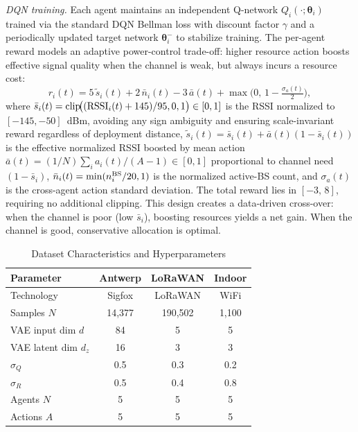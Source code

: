 \documentclass[conference]{IEEEtran}
\begin{document}
\textit{DQN training.}
Each agent maintains an independent Q-network $Q_i(\cdot;\bm{\theta}_i)$
trained via the standard DQN Bellman loss with discount factor $\gamma$
and a periodically updated target network $\bm{\theta}_i^-$
to stabilize training. The per-agent reward models an adaptive
power-control trade-off: higher resource action boosts effective signal
quality when the channel is weak, but always incurs a resource cost:
\vspace{-4pt}
\begin{equation}
r_i(t) = 5\,\tilde{s}_i(t) + 2\,\bar{n}_i(t)
        - 3\,\bar{a}(t)
        + \max\!\bigl(0,\,1 - \tfrac{\sigma_a(t)}{2}\bigr),
\label{eq:reward}
\end{equation}
\vspace{-2pt}
where $\bar{s}_i(t)=\mathrm{clip}\!\bigl(({\rm RSSI}_i(t)+145)/95,0,1\bigr)\in[0,1]$
is the RSSI normalized to $[-145,-50]$~dBm, avoiding any sign ambiguity
and ensuring scale-invariant reward regardless of deployment distance,
$\tilde{s}_i(t)=\bar{s}_i(t)+\bar{a}(t)(1-\bar{s}_i(t))$ is the
effective normalized RSSI boosted by mean action
$\bar{a}(t)=(1/N)\sum_i a_i(t)/(A{-}1)\in[0,1]$
proportional to channel need $(1-\bar{s}_i)$,
$\bar{n}_i(t)=\min(n_i^{\rm BS}/20,1)$ is the normalized active-BS count,
and $\sigma_a(t)$ is the cross-agent action standard deviation.
The total reward lies in $[-3,\,8]$, requiring no additional clipping.
This design creates a data-driven cross-over: when the channel is poor
(low $\bar{s}_i$), boosting resources yields a net gain. When the
channel is good, conservative allocation is optimal.

\begin{table}[t]
\centering
\caption{Dataset Characteristics and Hyperparameters}
\label{tab:config}
\setlength{\tabcolsep}{3pt}
\begin{tabular}{lccc}
\toprule
\textbf{Parameter} & \textbf{Antwerp} & \textbf{LoRaWAN} & \textbf{Indoor}\\
\midrule
Technology           & Sigfox  & LoRaWAN & WiFi   \\
Samples $N$          & 14,377  & 190,502 & 1,100  \\
VAE input dim $d$    & 84      & 5       & 5      \\
VAE latent dim $d_z$ & 16      & 3       & 3      \\
$\sigma_Q$           & 0.5     & 0.3     & 0.2    \\
$\sigma_R$           & 0.5     & 0.4     & 0.8    \\
Agents $N$           & 5       & 5       & 5      \\
Actions $A$          & 5       & 5       & 5      \\
\bottomrule
\end{tabular}
\end{table}
\end{document}
